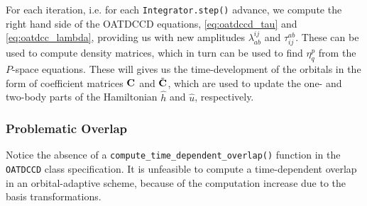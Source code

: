     For each iteration, i.e. for each 
    \lstinline{Integrator.step()} advance, we 
    compute the right hand side of the OATDCCD equations, \autoref{eq:oatdccd_tau} 
    and \autoref{eq:oatdcc_lambda}, providing us with new amplitudes 
    $\lambda^{ij}_{ab}$ and $\tau^{ab}_{ij}$. These can be used to compute density 
    matrices, which in turn can be used to find $\eta^p_q$ from the $P$-space 
    equations. These will gives us the time-development of the orbitals in 
    the form of coefficient matrices $\vb{C}$ and $\tilde{\vb{C}}$, which are used 
    to update the one- and two-body parts of the Hamiltonian $\hat{h}$ and $\hat{u}$,
    respectively.

    \subsubsection{Problematic Overlap}

    Notice the absence of a \lstinline{compute_time_dependent_overlap()} function
    in the \lstinline{OATDCCD} class specification. It is unfeasible to compute 
    a time-dependent overlap in an orbital-adaptive scheme, because of the 
    computation increase due to the basis transformations.

